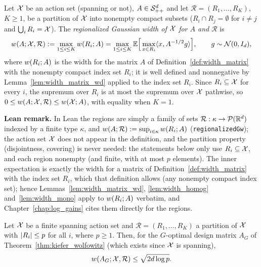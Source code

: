 \begin{definition}\label{def:regionalized_width}
\leanok
{}
Let $\mathcal{X}$ be an action set (spanning or not), $A \in \mathcal{S}_{++}^{d}$ and let
$\mathcal R = (R_1, \dots, R_K)$, $K \ge 1$, be a partition of
$\mathcal{X}$ into nonempty compact subsets ($R_i \cap R_j = \emptyset$ for $i \ne j$ and
$\bigcup_i R_i = \mathcal{X}$). The \emph{regionalized Gaussian width of $\mathcal{X}$ for $A$ and
$\mathcal R$} is
\[
  w(A; \mathcal{X}, \mathcal R) := \max_{1 \le i \le K} w(R_i;A)
  = \max_{1 \le i \le K}
  \mathbb{E}\Big[\max_{x \in R_i}\langle x, A^{-1/2}g \rangle\Big], \qquad g \sim \mathcal{N}(0, I_d),
\]
where $w(R_i;A)$ is the width for the matrix $A$ of Definition~\ref{def:width_matrix}
with the nonempty compact index set $R_i$; it is well defined and nonnegative by
Lemma~\ref{lem:width_matrix_wd} applied to the index set $R_i$. Since $R_i \subseteq \mathcal{X}$ for
every $i$, the supremum over $R_i$ is at most the supremum over $\mathcal{X}$ pathwise, so
$0 \le w(A;\mathcal{X},\mathcal R) \le w(\mathcal{X};A)$, with equality when $K = 1$.
\end{definition}

\textbf{Lean remark.} In Lean the regions are simply a family of sets
$\mathcal R : \kappa \to \mathcal P(\mathbb{R}^d)$ indexed by a finite type $\kappa$, and
$w(A;\mathcal R) := \sup_{i \in \kappa}w(R_i;A)$ (\texttt{regionalizedGw}); the
action set $\mathcal{X}$ does not appear in the definition, and the partition property (disjointness,
covering) is never needed: the statements below only use $R_i \subseteq \mathcal{X}$, and each region
nonempty (and finite, with at most $p$ elements). The inner
expectation is exactly the width for a matrix of Definition~\ref{def:width_matrix} with the
index set $R_i$, which that definition allows (any nonempty compact index set); hence
Lemmas~\ref{lem:width_matrix_wd}, \ref{lem:width_homog} and~\ref{lem:width_mono} apply to
$w(R_i;A)$ verbatim, and Chapter~\ref{chap:log_gains} cites them directly for the
regions.

\begin{proposition}\label{prop:width_partition}
\leanok
{}
Let $\mathcal{X}$ be a finite spanning action set and $\mathcal R = (R_1,\dots,R_K)$ a partition of
$\mathcal{X}$ with $\lvert R_i \rvert \le p$ for all $i$, where $p \ge 1$. Then, for the $G$-optimal design
matrix $A_G$ of Theorem~\ref{thm:kiefer_wolfowitz} (which exists since $\mathcal{X}$ is spanning),
\[
  w(A_G; \mathcal{X}, \mathcal R) \le \sqrt{2 d \log p}.
\]
\end{proposition}


